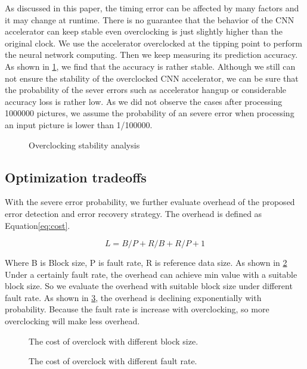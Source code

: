 As discussed in this paper, the timing error can be affected by many factors and it may change 
at runtime. There is no guarantee that the behavior of the CNN accelerator can keep stable even 
overclocking is just slightly higher than the original clock. We use the accelerator overclocked at the 
tipping point to perform the neural network computing. Then we keep measuring its 
prediction accuracy. As shown in \ref{fig:stability}, we find that the accuracy is rather stable.
Although we still can not ensure the stability of the overclocked CNN accelerator, we can 
be sure that the probability of the sever errors such as accelerator hangup or considerable 
accuracy loss is rather low. As we did not observe the cases after processing 1000000 pictures, 
we assume the probability of an severe error when processing an input picture is lower than 1/100000.

\begin{figure}
    \caption{Overclocking stability analysis}
\label{fig:stability}
\vspace{-1em}
\end{figure}

\subsection{Optimization tradeoffs}
With the severe error probability, we further evaluate overhead of 
the proposed error detection and error recovery strategy. The overhead 
is defined as Equation\ref{eq:cost}.

\begin{equation}
        \label{eq:cost}
L=B/P+R/B+R/P+1
\end{equation}

Where B is Block size, P is fault rate, R is reference data size. As shown in \ref{fig:cost_block}
Under a certainly fault rate, the overhead can achieve min value with a suitable block size. 
So we evaluate the overhead with suitable block size under different fault rate.  
As shown in \ref{fig:cost_probability}, the overhead is declining exponentially with probability.
Because the fault rate is increase with overclocking, so more overclocking will make less overhead.

\begin{figure}
    \caption{The cost of overclock with different block size.}
\label{fig:cost_block}
\vspace{-1em}
\end{figure}

\begin{figure}
    \caption{The cost of overclock with different fault rate.}
\label{fig:cost_probability}
\vspace{-1em}
\end{figure}

